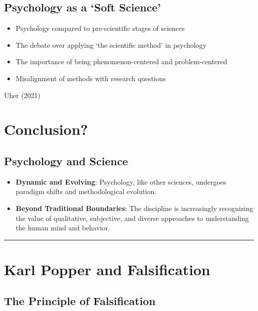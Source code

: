 \documentclass[
  letterpaper,
  DIV=11,
  numbers=noendperiod]{scrartcl}
\providecommand{\tightlist}{%
  \setlength{\itemsep}{0pt}\setlength{\parskip}{0pt}}\usepackage{longtable,booktabs,array}
\begin{document}
\subsection{Psychology as a `Soft
Science'}\label{psychology-as-a-soft-science}

\begin{itemize}
\tightlist
\item
  Psychology compared to pre-scientific stages of sciences
\item
  The debate over applying `the scientific method' in psychology
\item
  The importance of being phenomenon-centered and problem-centered
\item
  Misalignment of methods with research questions
\end{itemize}

Uher (2021)

\section{Conclusion?}\label{conclusion}

\subsection{Psychology and Science}\label{psychology-and-science}

\begin{itemize}
\tightlist
\item
  \textbf{Dynamic and Evolving}: Psychology, like other sciences,
  undergoes paradigm shifts and methodological evolution.
\item
  \textbf{Beyond Traditional Boundaries}: The discipline is increasingly
  recognizing the value of qualitative, subjective, and diverse
  approaches to understanding the human mind and behavior.
\end{itemize}

\begin{center}\rule{0.5\linewidth}{0.5pt}\end{center}

\section{Karl Popper and
Falsification}\label{karl-popper-and-falsification}

\subsection{The Principle of
Falsification}\label{the-principle-of-falsification}
\end{document}

